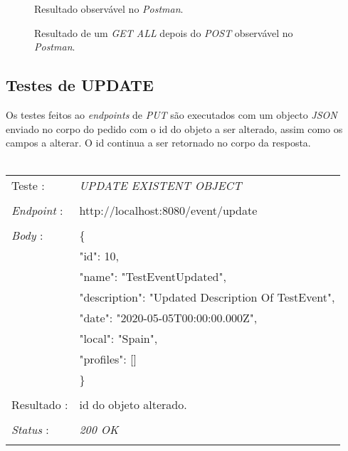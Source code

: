 \begin{figure}[h]
	\begin{center}
	\end{center}
	\caption{Resultado observável no \emph{Postman}.}\label{fig:eventfindbyid404}
\end{figure}
\newpage
\begin{figure}[h]
	\begin{center}
	\end{center}
	\caption{Resultado de um \emph{GET ALL} depois do \emph{POST} observável no \emph{Postman}.}\label{fig:eventallafterpost}
\end{figure}
\newpage

\subsection{Testes de UPDATE}\label{513}
Os testes feitos ao \emph{endpoints} de \emph{PUT} são executados com um objecto \emph{JSON} enviado no corpo do pedido com o id do objeto a ser alterado, assim como os campos a alterar. O id continua a ser retornado no corpo da resposta.\\
\\
\begin{tabular}{ll}
	Teste : & \emph{UPDATE EXISTENT OBJECT}\\
	\\
	\emph{Endpoint} : & http://localhost:8080/event/update\\
	\\
	\emph{Body} : & \{ \\
	& "id": 10, \\
	& "name": "TestEventUpdated",\\
	& "description": "Updated Description Of TestEvent",\\
	& "date": "2020-05-05T00:00:00.000Z",\\
	& "local": "Spain",\\
	& "profiles": []\\
	& \} \\
	\\
	Resultado : & id do objeto alterado.\\
	\\
	\emph{Status} : & \emph{200 OK}\\
	\\
\end{tabular}

